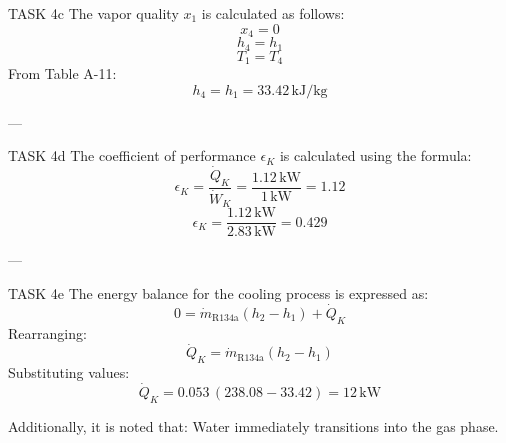 TASK 4c  
The vapor quality \( x_1 \) is calculated as follows:  
\[
x_4 = 0
\]
\[
h_4 = h_1
\]
\[
T_1 = T_4
\]
From Table A-11:  
\[
h_4 = h_1 = 33.42 \, \text{kJ/kg}
\]

---

TASK 4d  
The coefficient of performance \( \epsilon_K \) is calculated using the formula:  
\[
\epsilon_K = \frac{\dot{Q}_K}{\dot{W}_K} = \frac{1.12 \, \text{kW}}{1 \, \text{kW}} = 1.12
\]
\[
\epsilon_K = \frac{1.12 \, \text{kW}}{2.83 \, \text{kW}} = 0.429
\]

---

TASK 4e  
The energy balance for the cooling process is expressed as:  
\[
0 = \dot{m}_{\text{R134a}} (h_2 - h_1) + \dot{Q}_K
\]
Rearranging:  
\[
\dot{Q}_K = \dot{m}_{\text{R134a}} (h_2 - h_1)
\]
Substituting values:  
\[
\dot{Q}_K = 0.053 \, (238.08 - 33.42) = 12 \, \text{kW}
\]

Additionally, it is noted that:  
Water immediately transitions into the gas phase.